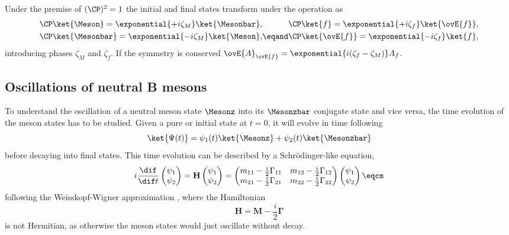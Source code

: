 Under the premise of $(\CP)^2 = 1$ the initial and final states transform under
the \CP operation as
%
\begin{equation}
  \begin{alignedat}{2}
    & \CP\ket{\Meson}    = \exponential{+i\zeta_{M}} \ket{\Mesonbar}, && \CP \ket{f}        = \exponential{+i\zeta_{f}} \ket{\ovE{f}}, \\
    & \CP\ket{\Mesonbar} = \exponential{-i\zeta_{M}} \ket{\Meson}   , &\eqand& \CP \ket{\ovE{f}}  = \exponential{-i\zeta_{f}} \ket{f},
  \end{alignedat}
\end{equation}
%
introducing phases $\zeta_M$ and $\zeta_f$. If the \CP symmetry is conserved
$\ovE{A}_{\ovE{f}} = \exponential{i(\zeta_f - \zeta_M)} A_f$.

\subsection{Oscillations of neutral B mesons}
\label{sec:cpv_theory:flavour_physics:bmixing}

To understand the oscillation of a neutral meson state $\Mesonz$ into its
$\Mesonzbar$ \CP conjugate state and vice versa, the time evolution of the meson
states has to be studied. Given a pure \Mesonz or \Mesonzbar initial state at
$t=0$, it will evolve in time following
%
\begin{equation}
  \ket{\Psi(t)} = \psi_1(t) \ket{\Mesonz} + \psi_2(t) \ket{\Mesonzbar}
\end{equation}
%
before decaying into final states. This time evolution can be described by a
Schrödinger-like equation,
%
\begin{equation}
  i \frac{\dif}{\dif t} 
  \begin{pmatrix}
    \psi_1 \\
    \psi_2
  \end{pmatrix}
  =
  \mathbf{H}
  \begin{pmatrix}
    \psi_1 \\
    \psi_2
  \end{pmatrix}
  =
  \begin{pmatrix}
    m_{11} - \frac{i}{2} \Gamma_{11}    & m_{12} - \frac{i}{2} \Gamma_{12} \\
    m_{21} - \frac{i}{2} \Gamma_{21}    & m_{22} - \frac{i}{2} \Gamma_{22} \\
  \end{pmatrix}
  \begin{pmatrix}
    \psi_1 \\
    \psi_2
  \end{pmatrix}\eqcm
\end{equation}
%
following the Weisskopf-Wigner approximation
\cite{Weisskopf:1930au,Weisskopf:1930ps}, where the Hamiltonian
%
\begin{equation}
  \mathbf{H} = \mathbf{M} - \frac{i}{2} \mathbf{\Gamma}
\end{equation}
%
is not Hermitian, as otherwise the meson states would just oscillate without
decay.

